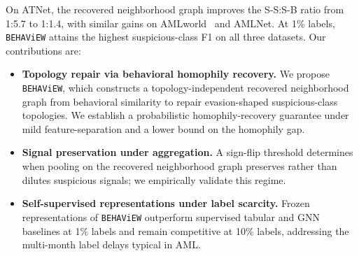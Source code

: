 \documentclass[sigconf,natbib=true,anonymous=true]{acmart}
\theoremstyle{definition}
\newcommand{\method}{\texttt{BEHAViEW}\xspace}
\newcommand{\hofinet}{ATNet\xspace} %
\begin{document}
On \hofinet, the recovered neighborhood graph improves the S-S:S-B ratio from 1:5.7 to 1:1.4, with similar gains on AMLworld~\cite{amlpatterns2024realistic} and AMLNet. At 1\% labels, \method attains the highest suspicious-class F1 on all three datasets. Our contributions are:

\begin{itemize}[leftmargin=*, topsep=2pt, itemsep=1pt, parsep=0pt, partopsep=0pt]
    \item \textbf{Topology repair via behavioral homophily recovery.} We propose \method, which constructs a topology-independent recovered neighborhood graph from behavioral similarity to repair evasion-shaped suspicious-class topologies. We establish a probabilistic homophily-recovery guarantee under mild feature-separation and a lower bound on the homophily gap.
    \item \textbf{Signal preservation under aggregation.} A sign-flip threshold determines when pooling on the recovered neighborhood graph preserves rather than dilutes suspicious signals; we empirically validate this regime.
    \item \textbf{Self-supervised representations under label scarcity.} Frozen representations of \method outperform supervised tabular and GNN baselines at 1\% labels and remain competitive at 10\% labels, addressing the multi-month label delays typical in AML.
\end{itemize}
\end{document}
